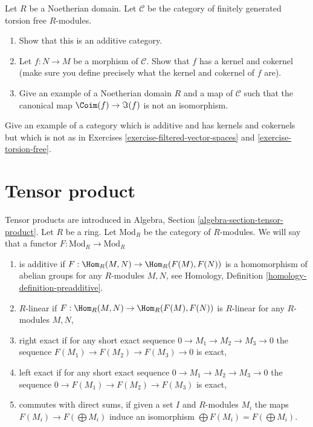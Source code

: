 \begin{exercise}
\label{exercise-torsion-free}
Let $R$ be a Noetherian domain. Let $\mathcal{C}$ be the category of
finitely generated torsion free $R$-modules.
\begin{enumerate}
\item Show that this is an additive category.
\item Let $f : N \to M$ be a morphism of $\mathcal{C}$.
Show that $f$ has a kernel and cokernel (make sure you define precisely
what the kernel and cokernel of $f$ are).
\item Give an example of a Noetherian domain $R$ and a map of
$\mathcal{C}$ such that the canonical map $\Coim(f) \to \Im(f)$
is not an isomorphism.
\end{enumerate}
\end{exercise}

\begin{exercise}
\label{exercise-other}
Give an example of a category which is additive and has kernels
and cokernels but which is not as in
Exercises \ref{exercise-filtered-vector-spaces} and
\ref{exercise-torsion-free}.
\end{exercise}





\section{Tensor product}
\label{section-tensor-product}

\noindent
Tensor products are introduced in Algebra, Section
\ref{algebra-section-tensor-product}.
Let $R$ be a ring. Let $\text{Mod}_R$ be the category of $R$-modules.
We will say that a functor $F : \text{Mod}_R \to \text{Mod}_R$
\begin{enumerate}
\item is additive if
$F : \Hom_R(M, N) \to \Hom_R(F(M), F(N))$
is a homomorphism of abelian groups
for any $R$-modules $M, N$, see
Homology, Definition \ref{homology-definition-preadditive}.
\item $R$-linear if $F : \Hom_R(M, N) \to \Hom_R(F(M), F(N))$ is $R$-linear
for any $R$-modules $M, N$,
\item right exact if for any short exact sequence
$0 \to M_1 \to M_2 \to M_3 \to 0$ the sequence
$F(M_1) \to F(M_2) \to F(M_3) \to 0$ is exact,
\item left exact if for any short exact sequence
$0 \to M_1 \to M_2 \to M_3 \to 0$ the sequence
$0 \to F(M_1) \to F(M_2) \to F(M_3)$ is exact,
\item commutes with direct sums, if given a set
$I$ and $R$-modules $M_i$ the maps
$F(M_i) \to F(\bigoplus M_i)$ induce an isomorphism
$\bigoplus F(M_i) = F(\bigoplus M_i)$.
\end{enumerate}

